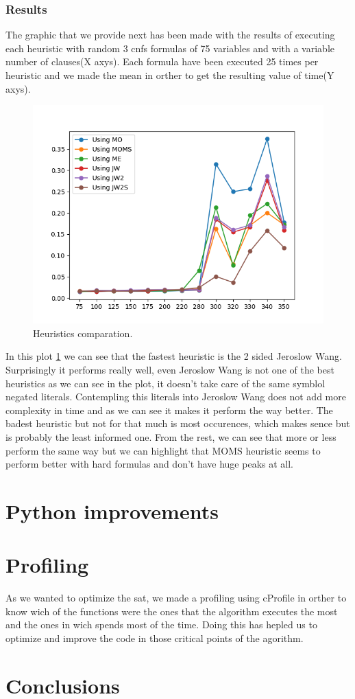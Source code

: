 \documentclass{article}
\begin{document}
\subsubsection{Results}
The graphic that we provide next has been made with the results of executing each heuristic with random 3 cnfs formulas of 75 variables and with a variable number of clauses(X axys). Each formula have been executed 25 times per heuristic and we made the mean in orther to get the resulting value of time(Y axys).   
\begin{figure}[H]
  \includegraphics[width=\linewidth]{../utils/plots/heuristics.png}
  \caption{Heuristics comparation.}
  \label{fig:heu}
\end{figure}
In this plot \ref{fig:heu} we can see that the fastest heuristic is the 2 sided Jeroslow Wang. Surprisingly it performs really well, even Jeroslow Wang is not one of the best heuristics as we can see in the plot, it doesn't take care of the same symblol negated literals. Contempling this literals into Jeroslow Wang does not add more complexity in time and as we can see it makes it perform the way better.
The badest heuristic but not for that much is most occurences, which makes sence but is probably the least informed one. 
From the rest, we can see that more or less perform the same way but we can highlight that MOMS heuristic seems to perform better with hard formulas and don't have huge peaks at all.
\section{Python improvements}
%
\section{Profiling}
%
As we wanted to optimize the sat, we made a profiling using cProfile in orther to know wich of the functions were the ones that the algorithm executes the most and the ones in wich spends most of the time. Doing this has hepled us to optimize and improve the code in those critical points of the agorithm.
\section{Conclusions}
\end{document}
